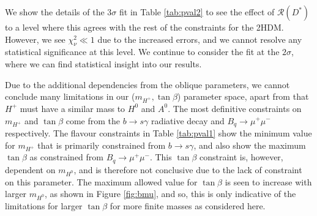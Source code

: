 \documentclass[a4paper,12pt]{article}
\begin{document}
We show the details of the $3\sigma$ fit in Table \ref{tab:pval2} to see the effect of $\mathcal{R}(D^*)$ to a level where this agrees with the rest of the constraints for the 2HDM. 
However, we see $\chi^2_{\nu}\ll1$ due to the increased errors, and we cannot resolve any statistical significance at this level.
We continue to consider the fit at the $2\sigma$, where we can find statistical insight into our results.

Due to the additional dependencies from the oblique parameters, we cannot conclude many limitations in our ($m_{H^+},\tan\beta$) parameter space, apart from that $H^+$ must have a similar mass to $H^0$ and $A^0$. 
The most definitive constraints on $m_{H^+}$ and $\tan\beta$ come from the $b\to s\gamma$ radiative decay and $B_q\to\mu^+\mu^-$ respectively. 
The flavour constraints in Table \ref{tab:pval1} show the minimum value for $m_{H^+}$ that is primarily constrained from $b\to s\gamma$, and also show the maximum $\tan\beta$ as constrained from $B_q\to\mu^+\mu^-$. 
This $\tan\beta$ constraint is, however, dependent on $m_{H^0}$, and is therefore not conclusive due to the lack of constraint on this parameter. 
The maximum allowed value for $\tan\beta$ is seen to increase with larger $m_{H^0}$, as shown in Figure \ref{fig:bmu}, and so, this is only indicative of the limitations for larger $\tan\beta$ for more finite masses as considered here.
\end{document}
